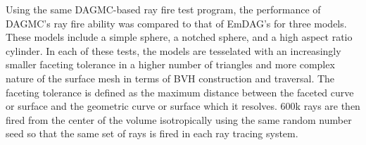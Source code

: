\documentclass[12pt, a4paper]{article}
\begin{document}
Using the same DAGMC-based ray fire test program, the performance of DAGMC's ray fire ability was compared to that of EmDAG's for three models. These models include a simple sphere, a notched sphere, and a high aspect ratio cylinder. In each of these tests, the models are tesselated with an increasingly smaller faceting tolerance in a higher number of triangles and more complex nature of the surface mesh in terms of BVH construction and traversal. The faceting tolerance is defined as the maximum distance between the faceted curve or surface and the geometric curve or surface which it resolves. 600k rays are then fired from the center of the volume isotropically using the same random number seed so that the same set of rays is fired in each ray tracing system.

\begin{figure}

  \begin{center}
    

\end{center}
\end{figure}
\end{document}
